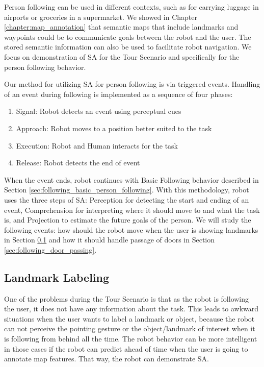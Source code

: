 Person following can be used in different contexts, such as for carrying luggage in airports or groceries in a supermarket. We showed in Chapter \ref{chapter:map_annotation} that semantic maps that include landmarks and waypoints could be to communicate goals between the robot and the user.  The stored semantic information can also be used to facilitate robot navigation. We focus on demonstration of SA for the Tour Scenario and specifically for the person following behavior.

Our method for utilizing SA for person following is via triggered events. Handling of an event during following is implemented as a sequence of four phases:

\begin{enumerate}
\item Signal: Robot detects an event using perceptual cues
\item Approach: Robot moves to a position better suited to the task
\item Execution: Robot and Human interacts for the task
\item Release: Robot detects the end of event
\end{enumerate}

When the event ends, robot continues with Basic Following behavior described in Section \ref{sec:following_basic_person_following}. With this methodology, robot uses the three steps of SA: Perception for detecting the start and ending of an event, Comprehension for interpreting where it should move to and what the task is, and Projection to estimate the future goals of the person. We will study the following events: how should the robot move when the user is showing landmarks in Section \ref{sec:following_landmark_labeling} and how it should handle passage of doors in Section \ref{sec:following_door_passing}.



\subsection{Landmark Labeling}
\label{sec:following_landmark_labeling}

One of the problems during the Tour Scenario is that as the robot is following the user, it does not have any information about the task. This leads to awkward situations when the user wants to label a landmark or object, because the robot can not perceive the pointing gesture or the object/landmark of interest when it is following from behind all the time. The robot behavior can be more intelligent in those cases if the robot can predict ahead of time when the user is going to annotate map features. That way, the robot can demonstrate SA.

